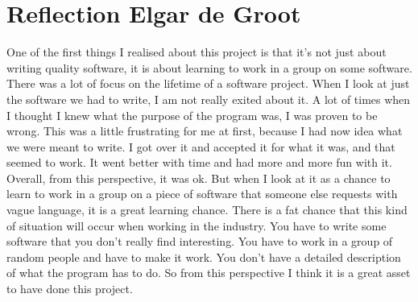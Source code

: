 \section{Reflection Elgar de Groot}
One of the first things I realised about this project is that it's not just about writing quality software, it is about learning to work in a group on some software. There was a lot of focus on the lifetime of a software project. When I look at just the software we had to write, I am not really exited about it. A lot of times when I thought I knew what the purpose of the program was, I was proven to be wrong. This was a little frustrating for me at first, because I had now idea what we were meant to write. I got over it and accepted it for what it was, and that seemed to work. It went better with time and had more and more fun with it. Overall, from this perspective, it was ok.
But when I look at it as a chance to learn to work in a group on a piece of software that someone else requests with vague language, it is a great learning chance. There is a fat chance that this kind of situation will occur when working in the industry. You have to write some software that you don't really find interesting. You have to work in a group of random people and have to make it work. You don't have a detailed description of what the program has to do. So from this perspective I think it is a great asset to have done this project.

